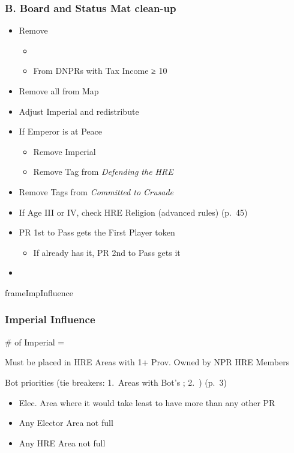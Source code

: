 \documentclass[10pt]{article}
\newlength{\fhImpInfluence} \setlength\fhImpInfluence{10\baselineskip}
\begin{document}
\subsubsection*{B. Board and Status Mat clean-up}
\begin{itemize}
	\item Remove \alliances
	\begin{itemize}
		\item {}
		\item From DNPRs with Tax Income ≥ 10\ducats
	\end{itemize}
	\item Remove all \plague from Map
	\item {}Adjust Imperial \influence and redistribute
	\item If Emperor is at Peace
	\begin{itemize}
		\item Remove Imperial \manpower
		\item Remove Tag from \emph{Defending the HRE}
	\end{itemize}
	\item Remove Tags from \emph{Committed to Crusade}
	\item {}If Age III or IV, check HRE Religion (advanced rules) (p.~45)
	\item PR 1st to Pass gets the First Player token
	\begin{itemize}
		\item If already has it, PR 2nd to Pass gets it
	\end{itemize}
	\item {}
\end{itemize}
\begin{dynamiccontents*}{frameImpInfluence}\begin{eubox}{\fhImpInfluence}
	\subsubsection*{Imperial Influence }
	\begin{itemize}
		\item \# of Imperial \influence = \authority
		\item Must be placed in HRE Areas with 1+ Prov. Owned by NPR HRE Members
		{\botrules
		\item Bot priorities (tie breakers: 1. Areas with Bot's \allies; 2. \az) (p.~3)
		\begin{itemize}
			\item Elec. Area where it would take least \influence to have more \influence than any other PR
			\item Any Elector Area not full
			\item Any HRE Area not full
		\end{itemize}
		}
	\end{itemize}
\end{eubox}\end{dynamiccontents*}
\end{document}
